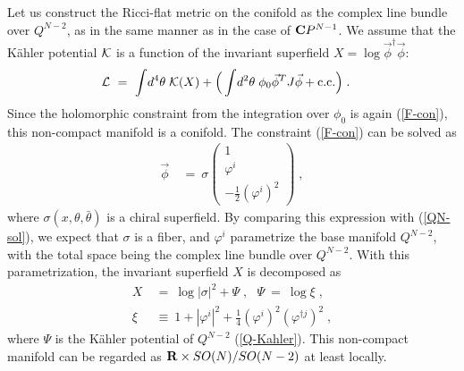\documentclass[a4paper,11pt]{article}
\newcommand{\half}{\frac{1}{2}}
\newcommand{\kahler}{K\"{a}hler }
\newcommand{\bsubeq}{\begin{subequations}}
\newcommand{\esubeq}{\end{subequations}}
\begin{document}
{Let us construct the Ricci-flat metric on the conifold 
as the complex line bundle 
over $Q^{N-2}$, as in the same manner as 
in the case of ${\bf C}P^{N-1}$.
We assume that the \kahler potential 
${\cal K}$ is a function of the
invariant superfield 
$X = \log \vec{\phi}^{\dagger} \vec{\phi}$:
\begin{align}
{\cal L} 
\ &= \ 
\int \! d^4 \theta \; 
{\cal K} (X) 
+ \Big( 
\int \! d^2 \theta \; \phi_0 \vec{\phi}^T J \vec{\phi} + \mbox{c.c.} 
\Big) \; . \label{LQ-L}
\end{align}
Since the holomorphic constraint from 
the integration over $\phi_0$ 
is again (\ref{F-con}), 
this non-compact manifold is a conifold. 
The constraint (\ref{F-con}) can be solved as
\begin{align}
\vec{\phi} \ &= \ \sigma \left(
\begin{array}{c}
1 \\
\varphi^i \\
- \half (\varphi^i)^2
\end{array} \right) \; ,
\end{align}
where $\sigma (x, \theta, \bar{\theta})$ 
is a chiral superfield.
By comparing this expression with (\ref{QN-sol}), 
we expect that $\sigma$ is 
a fiber, and $\varphi^i$ parametrize 
the base manifold $Q^{N-2}$, 
with the total space being the complex line bundle over $Q^{N-2}$. 
With this parametrization,
the invariant superfield $X$ is decomposed as
\bsubeq
\begin{align}
X \ &= \ 
\log |\sigma|^2 + \Psi \; , \ \ \ 
\Psi  \ = \ \log \xi \; , \\
\xi \ &\equiv \ 
1 + |\varphi^i|^2 + \frac{1}{4} (\varphi^{i})^2 
(\varphi^{\dagger j})^2 \; , 
\label{xi-q}
\end{align}
\esubeq
where $\Psi$ is the \kahler potential of 
$Q^{N-2}$ (\ref{Q-Kahler}).
This non-compact manifold can be 
regarded as ${\bf R} \times SO(N) / SO(N-2)$ at least locally.

}
\end{document}
